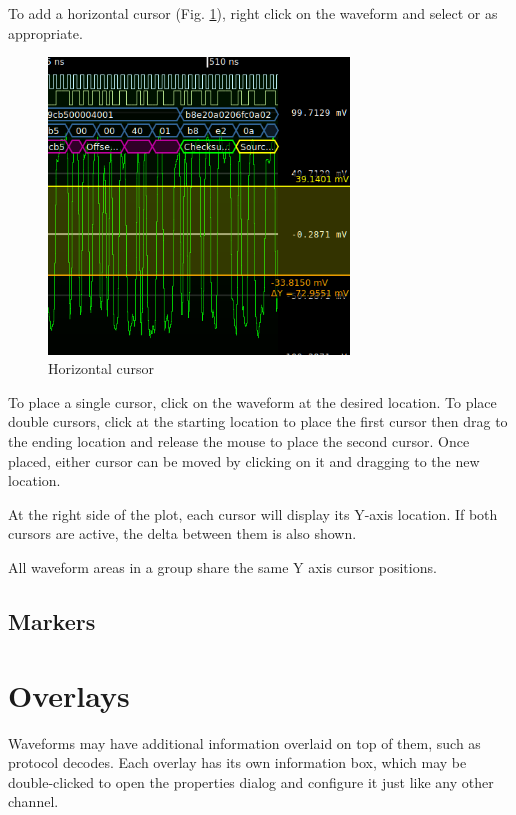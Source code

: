 To add a horizontal cursor (Fig. \ref{horizontal-cursor}), right click on the waveform and select  or  as appropriate.

\begin{figure}[H]
\centering
\includegraphics[width=8cm]{images/horizontal-cursor.png}
\caption{Horizontal cursor}
\label{horizontal-cursor}
\end{figure}

To place a single cursor, click on the waveform at the desired location. To place double cursors, click at the starting
location to place the first cursor then drag to the ending location and release the mouse to place the second cursor.
Once placed, either cursor can be moved by clicking on it and dragging to the new location.

At the right side of the plot, each cursor will display its Y-axis location. If both cursors are active, the delta
between them is also shown.

All waveform areas in a group share the same Y axis cursor positions.

\subsection{Markers}


\section{Overlays}

Waveforms may have additional information overlaid on top of them, such as protocol decodes. Each overlay has its own
information box, which may be double-clicked to open the properties dialog and configure it just like any other
channel.

